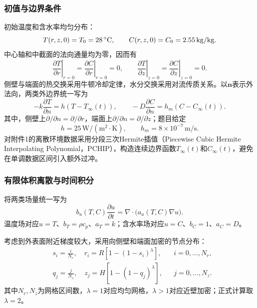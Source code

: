 \subsubsection{初值与边界条件}
初始温度和含水率均匀分布：
\begin{equation}\label{eq:initial}
T(r,z,0)=T_0=28\,{}^\circ\mathrm{C},\qquad
C(r,z,0)=C_0=2.55\,\mathrm{kg/kg}.
\end{equation}
\noindent 中心轴和中截面的法向通量均为零，因而有
\begin{equation}\label{eq:symmetry}
\left.\frac{\partial T}{\partial r}\right|_{r=0}
=\left.\frac{\partial C}{\partial r}\right|_{r=0}=0,\qquad
\left.\frac{\partial T}{\partial z}\right|_{z=0}
=\left.\frac{\partial C}{\partial z}\right|_{z=0}=0.
\end{equation}
\noindent 侧壁与端面的热交换采用牛顿冷却定律，水分交换采用对流传质关系。以$\boldsymbol n$表示外法向，两类外边界统一写为
\begin{equation}\label{eq:robin}
-k\frac{\partial T}{\partial n}=h(T-T_\infty(t)),\qquad
-D\frac{\partial C}{\partial n}=h_m(C-C_\infty(t)).
\end{equation}
\noindent 其中，侧壁上$\partial/\partial n=\partial/\partial r$，端面上$\partial/\partial n=\partial/\partial z$；题目给定
\begin{equation}
h=25\,\mathrm{W/(m^2\cdot K)},\qquad
h_m=8\times10^{-7}\,\mathrm{m/s}.
\end{equation}
\noindent 对附件1的离散环境数据采用分段三次Hermite插值（Piecewise Cubic Hermite Interpolating Polynomial，PCHIP）\cite{fritsch1980monotone}，构造连续边界函数$T_\infty(t)$和$C_\infty(t)$，避免在单调数据区间引入额外过冲。

\subsubsection{有限体积离散与时间积分}
将两类场量统一写为
\begin{equation}\label{eq:unified}
b_u(T,C)\frac{\partial u}{\partial t}
=\nabla\cdot\bigl(a_u(T,C)\nabla u\bigr).
\end{equation}
温度场对应$u=T$、$b_T=\rho c_p$、$a_T=k$；含水率场对应$u=C$、$b_C=1$、$a_C=D$。

考虑到外表面附近梯度较大，采用向侧壁和端面加密的节点分布：
\begin{equation}\label{eq:grid}
\begin{aligned}
&s_i=\frac{i}{N_r},\quad
r_i=R\left[1-(1-s_i)^\lambda\right],&&i=0,\ldots,N_r,\\
&q_j=\frac{j}{N_z},\quad
z_j=H\left[1-(1-q_j)^\lambda\right],&&j=0,\ldots,N_z.
\end{aligned}
\end{equation}
其中$N_r,N_z$为网格区间数，$\lambda=1$对应均匀网格，$\lambda>1$对应近壁加密；正式计算取$\lambda=2$。

